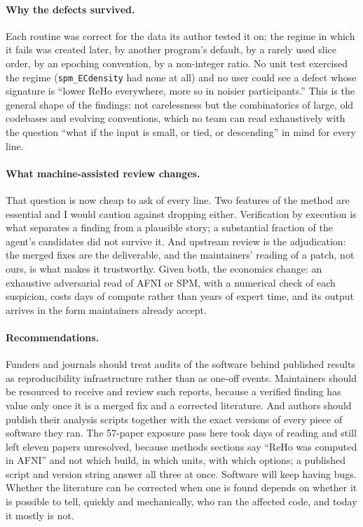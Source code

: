 \documentclass[11pt]{article}
\newcommand{\code}[1]{\texttt{#1}}
\begin{document}
\paragraph{Why the defects survived.} Each routine was correct for the data its author tested it on; the regime in which it fails was created later, by another program's default, by a rarely used slice order, by an epoching convention, by a non-integer ratio. No unit test exercised the regime (\code{spm\_ECdensity} had none at all) and no user could see a defect whose signature is ``lower ReHo everywhere, more so in noisier participants.'' This is the general shape of the findings: not carelessness but the combinatorics of large, old codebases and evolving conventions, which no team can read exhaustively with the question ``what if the input is small, or tied, or descending'' in mind for every line.

\paragraph{What machine-assisted review changes.} That question is now cheap to ask of every line. Two features of the method are essential and I would caution against dropping either. Verification by execution is what separates a finding from a plausible story; a substantial fraction of the agent's candidates did not survive it. And upstream review is the adjudication: the merged fixes are the deliverable, and the maintainers' reading of a patch, not ours, is what makes it trustworthy. Given both, the economics change: an exhaustive adversarial read of AFNI or SPM, with a numerical check of each suspicion, costs days of compute rather than years of expert time, and its output arrives in the form maintainers already accept.

\paragraph{Recommendations.} Funders and journals should treat audits of the software behind published results as reproducibility infrastructure rather than as one-off events. Maintainers should be resourced to receive and review such reports, because a verified finding has value only once it is a merged fix and a corrected literature. And authors should publish their analysis scripts together with the exact versions of every piece of software they ran. The 57-paper exposure pass here took days of reading and still left eleven papers unresolved, because methods sections say ``ReHo was computed in AFNI'' and not which build, in which units, with which options; a published script and version string answer all three at once. Software will keep having bugs. Whether the literature can be corrected when one is found depends on whether it is possible to tell, quickly and mechanically, who ran the affected code, and today it mostly is not.
\end{document}
